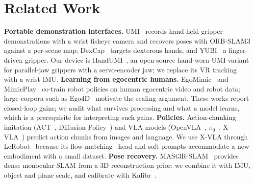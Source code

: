 \documentclass[conference,10pt]{IEEEtran}
\begin{document}
\section{Related Work}\label{sec:related}
\textbf{Portable demonstration interfaces.} UMI~\cite{chi2024umi} records hand-held gripper demonstrations with a wrist
fisheye camera and recovers poses with ORB-SLAM3 against a per-scene map; DexCap~\cite{wang2024dexcap} targets dexterous
hands, and YUBI~\cite{ohkawa2026yubi} a finger-driven gripper. Our device is HandUMI~\cite{handumi_hw}, an open-source
hand-worn UMI variant for parallel-jaw grippers with a servo-encoder jaw; we replace its VR tracking with a wrist IMU.
\textbf{Learning from egocentric humans.} EgoMimic~\cite{kareer2024egomimic} and MimicPlay~\cite{wang2023mimicplay} co-train
robot policies on human egocentric video and robot data; large corpora such as Ego4D~\cite{grauman2022ego4d} motivate the
scaling argument. These works report closed-loop gains; we audit what survives processing and what a model learns, which is
a prerequisite for interpreting such gains.
\textbf{Policies.} Action-chunking imitation (ACT~\cite{zhao2023act}, Diffusion Policy~\cite{chi2023diffusion}) and VLA
models (OpenVLA~\cite{kim2024openvla}, $\pi_0$~\cite{black2024pi0}, X-VLA~\cite{zheng2025xvla}) predict action chunks from
images and language. We use X-VLA through LeRobot~\cite{cadene2024lerobot} because its flow-matching~\cite{lipman2023flow}
head and soft prompts accommodate a new embodiment with a small dataset.
\textbf{Pose recovery.} MASt3R-SLAM~\cite{murai2025mast3rslam} provides dense monocular SLAM from a 3D reconstruction prior;
we combine it with IMU, object and plane scale, and calibrate with Kalibr~\cite{furgale2013kalibr}.
\end{document}
